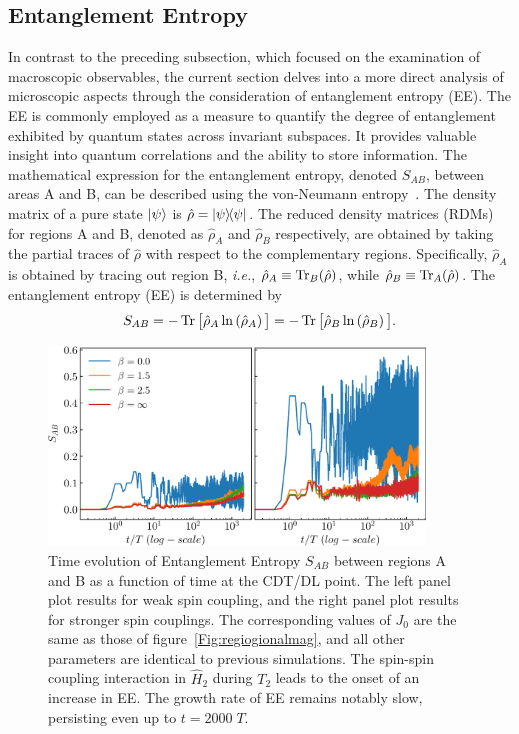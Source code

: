 \documentclass[12pt]{iopart}
\begin{document}
	
	
	\subsection{\label{sec:level41} Entanglement Entropy}
In contrast to the preceding subsection, which focused on the examination of macroscopic observables, the current section delves into a more direct analysis of microscopic aspects through the consideration of entanglement entropy (EE). The EE is commonly employed as a measure to quantify the degree of entanglement exhibited by quantum states across invariant subspaces. It provides valuable insight into quantum correlations and the ability to store information. The mathematical expression for the entanglement entropy, denoted $S_{AB}$, between areas A and B, can be described using the von-Neumann entropy~\cite{bayat_entanglement_2022,mendes-santos_measuring_2020}.   The density matrix of a pure state $\ket{\psi}$ is $\hat{\rho}= \ketbra{\psi}$. The reduced density matrices (RDMs) for regions A and B, denoted as $\hat{\rho}_A$ and $\hat{\rho}_B$ respectively, are obtained by taking the partial traces of $\hat{\rho}$ with respect to the complementary regions. Specifically, $\hat{\rho}_A$ is obtained by tracing out region B, \textit{i.e.}, $\hat{\rho}_A\equiv \mathop{\mathrm{Tr}}\nolimits_B(\hat{\rho})$, while $\hat{\rho}_B\equiv\mathop{\mathrm{Tr}}\nolimits_A(\hat{\rho})$. The entanglement entropy (EE) is determined by
\begin{equation} 
    S_{AB} = -\mathop{\mathrm{Tr}}\nolimits\big[\hat{\rho}_A \ln\left(\hat{\rho}_A\right)\big] = -\mathop{\mathrm{Tr}}\nolimits\big[\hat{\rho}_B \ln\left(\hat{\rho}_B\right)\big].
    \label{eq:vonentrop}
\end{equation}	
\begin{figure}[t!]
    \begin{center}
        \includegraphics[width=10cm]{figure11.pdf}
    \end{center}
    \caption{Time evolution of Entanglement Entropy $S_{AB}$ between regions A and B as a function of time at the CDT/DL point. The left panel plot results for weak spin coupling, and the right panel plot results for stronger spin couplings. The corresponding values of $J_0$ are the same as those of figure~\ref{Fig:regiogionalmag}, and all other parameters are identical to previous simulations. The spin-spin coupling interaction in $\hat{H}_2$ during $T_2$ leads to the onset of an increase in EE. The growth rate of EE remains notably slow, persisting even up to $t=2000\;T$.}
    \label{Fig:entangle}
\end{figure}
\end{document}
